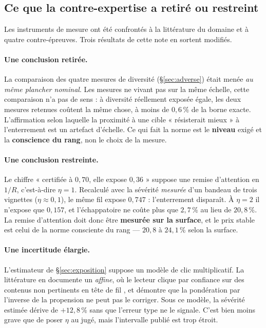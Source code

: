 \documentclass[11pt,a4paper]{article}
\begin{document}
\subsection{Ce que la contre-expertise a retiré ou restreint}
\label{sec:contreexpertise}

Les instruments de mesure ont été confrontés à la littérature du domaine et à quatre
contre-épreuves. Trois résultats de cette note en sortent modifiés.

\paragraph{Une conclusion retirée.} La comparaison des quatre mesures de diversité
(\S\ref{sec:adverse}) était menée \emph{au même plancher nominal}. Les mesures ne vivant pas sur
la même échelle, cette comparaison n'a pas de sens : à diversité réellement exposée égale, les
deux mesures retenues coûtent la même chose, à moins de $0{,}6\,\%$ de la borne exacte.
L'affirmation selon laquelle la proximité à une cible « résisterait mieux » à l'enterrement est
un artefact d'échelle. Ce qui fait la norme est le \textbf{niveau} exigé et la \textbf{conscience
du rang}, non le choix de la mesure.

\paragraph{Une conclusion restreinte.} Le chiffre « certifiée à $0{,}70$, elle expose $0{,}36$ »
suppose une remise d'attention en $1/R$, c'est-à-dire $\eta = 1$. Recalculé avec la sévérité
\emph{mesurée} d'un bandeau de trois vignettes ($\eta \approx 0{,}1$), le même fil expose
$0{,}747$ : l'enterrement disparaît. À $\eta = 2$ il n'expose que $0{,}157$, et l'échappatoire ne
coûte plus que $2{,}7\,\%$ au lieu de $20{,}8\,\%$. La remise d'attention doit donc être
\textbf{mesurée sur la surface}, et le prix stable est celui de la norme consciente du rang ---
$20{,}8$ à $24{,}1\,\%$ selon la surface.

\paragraph{Une incertitude élargie.} L'estimateur de \S\ref{sec:exposition} suppose un modèle de
clic multiplicatif. La littérature en documente un \emph{affine}, où le lecteur clique par
confiance sur des contenus non pertinents en tête de fil \citep{vardasbi2020}, et démontre que la
pondération par l'inverse de la propension ne peut pas le corriger. Sous ce modèle, la sévérité
estimée dérive de $+12{,}8\,\%$ sans que l'erreur type ne le signale. C'est bien moins grave que
de poser $\eta$ au jugé, mais l'intervalle publié est trop étroit.
\end{document}
